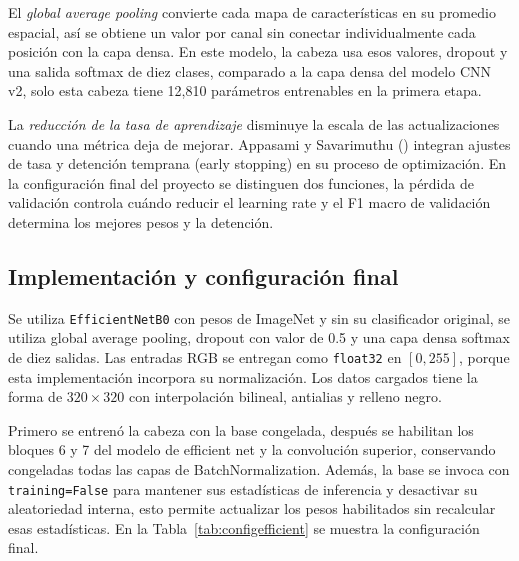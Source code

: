 \documentclass[conference]{IEEEtran}
\begin{document}
El \textit{global average pooling} convierte cada mapa de características en su promedio espacial, así se obtiene un valor por canal sin conectar individualmente cada posición con la capa densa. En este modelo, la cabeza usa esos valores, dropout y una salida softmax de diez clases, comparado a la capa densa del modelo CNN v2, solo esta cabeza tiene 12,810 parámetros entrenables en la primera etapa.

La \textit{reducción de la tasa de aprendizaje} disminuye la escala de las actualizaciones cuando una métrica deja de mejorar. Appasami y Savarimuthu (\citeyear{appasami2025}) integran ajustes de tasa y detención temprana (early stopping) en su proceso de optimización. En la configuración final del proyecto se distinguen dos funciones, la pérdida de validación controla cuándo reducir el learning rate y el F1 macro de validación determina los mejores pesos y la detención.

\subsection{Implementación y configuración final}

Se utiliza \texttt{EfficientNetB0} con pesos de ImageNet y sin su clasificador original, se utiliza global average pooling, dropout con valor de 0.5 y una capa densa softmax de diez salidas. Las entradas RGB se entregan como \texttt{float32} en $[0,255]$, porque esta implementación incorpora su normalización. Los datos cargados tiene la forma de $320\times320$ con interpolación bilineal, antialias y relleno negro.

Primero se entrenó la cabeza con la base congelada, después se habilitan los bloques 6 y 7 del modelo de efficient net y la convolución superior, conservando congeladas todas las capas de BatchNormalization. Además, la base se invoca con \texttt{training=False} para mantener sus estadísticas de inferencia y desactivar su aleatoriedad interna, esto permite actualizar los pesos habilitados sin recalcular esas estadísticas. En la Tabla~\ref{tab:configefficient} se muestra la configuración final.
\end{document}
